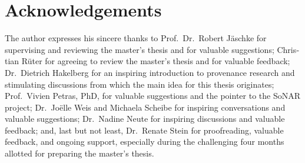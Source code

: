 \section{Acknowledgements}
\label{sec:acks}

The author expresses his sincere thanks to 
\foreignlanguage{ngerman}{Prof.\ Dr.\ Robert Jäschke} for supervising and reviewing the master's thesis
and for valuable suggestions; \foreignlanguage{ngerman}{Christian Rüter} for agreeing to review the master's thesis and for valuable feedback;
\foreignlanguage{ngerman}{Dr.\ Dietrich Hakelberg} for an inspiring introduction to provenance research
and stimulating discussions from which the main idea for this thesis originates;
%
\foreignlanguage{ngerman}{Prof.\ Vivien Petras, PhD}, for valuable suggestions and the pointer to the \gls{SoNAR} project;
%
\foreignlanguage{ngerman}{Dr.\ Joëlle Weis} and \foreignlanguage{ngerman}{Michaela Scheibe} for inspiring conversations and valuable suggestions;
\foreignlanguage{ngerman}{Dr.\ Nadine Neute} for inspiring discussions and valuable feedback;
and, last but not least,
\foreignlanguage{ngerman}{Dr.\ Renate Stein} for proofreading, valuable feedback, and ongoing support,
especially during the challenging four months allotted for preparing the master's thesis.

